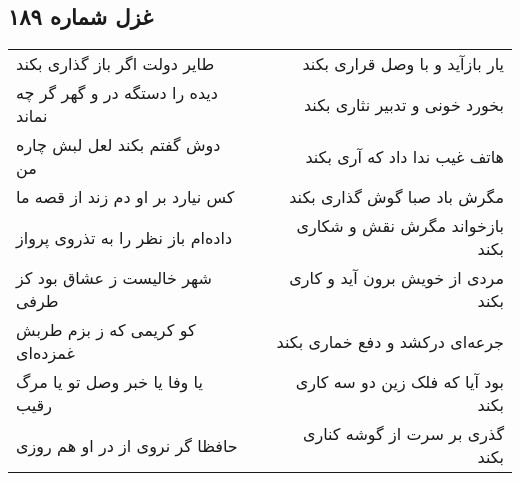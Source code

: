 \begin{center}
\section*{غزل شماره ۱۸۹}
\label{sec:sh189}
\begin{longtable}{l p{0.5cm} r}
طایر دولت اگر باز گذاری بکند
&&
یار بازآید و با وصل قراری بکند
\\
دیده را دستگه در و گهر گر چه نماند
&&
بخورد خونی و تدبیر نثاری بکند
\\
دوش گفتم بکند لعل لبش چاره من
&&
هاتف غیب ندا داد که آری بکند
\\
کس نیارد بر او دم زند از قصه ما
&&
مگرش باد صبا گوش گذاری بکند
\\
داده‌ام باز نظر را به تذروی پرواز
&&
بازخواند مگرش نقش و شکاری بکند
\\
شهر خالیست ز عشاق بود کز طرفی
&&
مردی از خویش برون آید و کاری بکند
\\
کو کریمی که ز بزم طربش غمزده‌ای
&&
جرعه‌ای درکشد و دفع خماری بکند
\\
یا وفا یا خبر وصل تو یا مرگ رقیب
&&
بود آیا که فلک زین دو سه کاری بکند
\\
حافظا گر نروی از در او هم روزی
&&
گذری بر سرت از گوشه کناری بکند
\\
\end{longtable}
\end{center}
